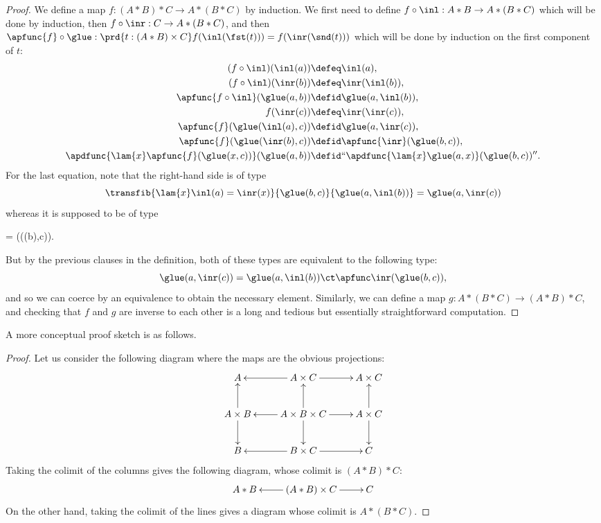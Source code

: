 {\begin{proof}
  We define a map $f:(A*B)*C\to A*(B*C)$ by induction. We first need to define
  $f\circ\inl:A*B\to A*(B*C)$ which will be done by induction, then
  $f\circ\inr:C\to A*(B*C)$, and then $\apfunc{f}\circ\glue:\prd{t:(A*B)\times
    C}f(\inl(\fst(t)))=f(\inr(\snd(t)))$ which will be done by induction on the
  first component of $t$:
  \begin{align*}
    (f\circ\inl)(\inl(a)) &\defeq \inl(a), \\
    (f\circ\inl)(\inr(b)) &\defeq \inr(\inl(b)), \\
    \apfunc{f\circ\inl}(\glue(a,b)) &\defid \glue(a,\inl(b)), \\
    f(\inr(c)) &\defeq \inr(\inr(c)),\\
    \apfunc{f}(\glue(\inl(a),c)) &\defid\glue(a,\inr(c)),\\
    \apfunc{f}(\glue(\inr(b),c)) &\defid\apfunc{\inr}(\glue(b,c)),\\
    \apdfunc{\lam{x}\apfunc{f}(\glue(x,c))}(\glue(a,b)) &\defid
    ``\apdfunc{\lam{x}\glue(a,x)}(\glue(b,c))''.
  \end{align*}
  For the last equation, note that the right-hand side is of type
  \[\transfib{\lam{x}\inl(a)=\inr(x)}{\glue(b,c)}{\glue(a,\inl(b))}=
  \glue(a,\inr(c))\]
  whereas it is supposed to be of type
  \begin{narrowmultline*}
    = \narrowbreak
    (\glue(\inr(b),c)).
  \end{narrowmultline*}
  But by the previous clauses in the definition, both of these types are equivalent to the following type:
  \[\glue(a,\inr(c))=\glue(a,\inl(b))\ct\apfunc\inr(\glue(b,c)),\]
  and so we can coerce by an equivalence to obtain the necessary element.
  Similarly, we can define a map $g:A*(B*C)\to(A*B)*C$, and checking that $f$ and
  $g$ are inverse to each other is a long and tedious but essentially
  straightforward computation.
\end{proof}

A more conceptual proof sketch is as follows.

\begin{proof}
  Let us consider the following diagram where the maps are the obvious
  projections:
  \[\xymatrix{
    A & A\times C \ar[l] \ar[r] & A\times C\\
    A\times B \ar[u] \ar[d] & A\times B\times C \ar[l]\ar[u]\ar[r]\ar[d] &
    A\times C \ar[u] \ar[d] \\
    B & B\times C \ar[l] \ar[r] & C}\]
  Taking the colimit of the columns gives the following
  diagram, whose colimit is $(A*B)*C$:
  \[\xymatrix{A*B & (A*B)\times C \ar[l]\ar[r] & C}\]
  On the other hand, taking the colimit of the lines gives a diagram whose
  colimit is $A*(B*C)$.


\end{proof}}
